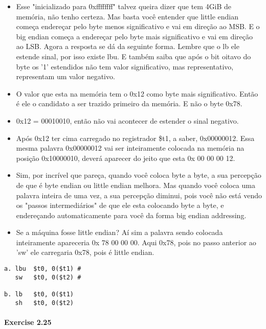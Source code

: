 \documentclass{article}
\begin{document}
\begin{itemize}
\item Esse "inicializado para 0xffffffff" talvez queira dizer que tem 4GiB de
memória, não tenho certeza. Mas basta você entender que little endian começa
endereçar pelo byte menos significativo e vai em direção ao MSB. E o big endian
começa a endereçar pelo byte mais significativo e vai em direção ao LSB. Agora
a resposta se dá da seguinte forma. Lembre que o lb ele estende sinal, por isso
existe lbu. E também saiba que após o bit oitavo do byte os '1' estendidos não
tem valor significativo, mas representativo, representam um valor negativo.

\item O valor que esta na memória tem o 0x12 como byte mais significativo.
Então é ele o candidato a ser trazido primeiro da memória. E não o byte 0x78.

\item 0x12 = 00010010, então não vai acontecer de estender o sinal negativo.

\item Após 0x12 ter cima carregado no registrador \$t1, a saber, 0x00000012.
Essa mesma palavra 0x00000012 vai ser inteiramente colocada na memória na
posição 0x10000010, deverá aparecer do jeito que esta 0x 00 00 00 12.

\item Sim, por incrível que pareça, quando você coloca byte a byte, a sua
percepção de que é byte endian ou little endian melhora. Mas quando você coloca
uma palavra inteira de uma vez, a sua percepção diminui, pois você não está
vendo os "passos intermediários" de que ele esta colocando byte a byte, e
endereçando automaticamente para você da forma big endian addressing.

\item Se a máquina fosse little endian? Aí sim a palavra sendo colocada
inteiramente apareceria 0x 78 00 00 00. Aqui 0x78, pois no passo anterior ao
'sw' ele carregaria 0x78, pois é little endian.
\end{itemize}



\begin{verbatim}
a. lbu  $t0, 0($t1) #
   sw   $t0, 0($t2) #

b. lb   $t0, 0($t1)
   sh   $t0, 0($t2)
\end{verbatim}

\paragraph{Exercise 2.25}
\end{document}
